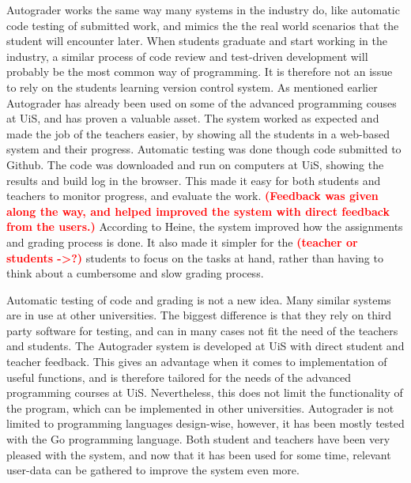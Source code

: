 \documentclass[12pt,a4paper]{report}
\newcommand\worry[1]{\textcolor{red}{\textbf{\small{(#1)}}}}
\begin{document}
Autograder works the same way many systems in the industry do, like automatic code testing of submitted work, and mimics the the real world scenarios that the student will encounter later. When students graduate and start working in the industry, a similar process of code review and test-driven development will probably be the most common way of programming. It is therefore not an issue to rely on the students learning version control system. As mentioned earlier Autograder has already been used on some of the advanced programming couses at UiS, and has proven a valuable asset. The system worked as expected and made the job of the teachers easier, by showing all the students in a web-based system and their progress. Automatic testing was done though code submitted to Github. The code was downloaded and run on computers at UiS, showing the results and build log in the browser. This made it easy for both students and teachers to monitor progress, and evaluate the work. \worry{Feedback was given along the way, and helped improved the system with direct feedback from the users.} According to Heine, the system improved how the assignments and grading process is done. It also made it simpler for the \worry{teacher or students ->?} students to focus on the tasks at hand, rather than having to think about a cumbersome and slow grading process.

Automatic testing of code and grading is not a new idea. Many similar systems are in use at other universities. The biggest difference is that they rely on third party software for testing, and can in many cases not fit the need of the teachers and students. The Autograder system is developed at UiS with direct student and teacher feedback. This gives an advantage when it comes to implementation of useful functions, and is therefore tailored for the needs of the advanced programming courses at UiS. Nevertheless, this does not limit the functionality of the program, which can be implemented in other universities. Autograder is not limited to programming languages design-wise, however, it has been mostly tested with the Go programming language. Both student and teachers have been very pleased with the system, and now that it has been used for some time, relevant user-data can be gathered to improve the system even more.
\end{document}
